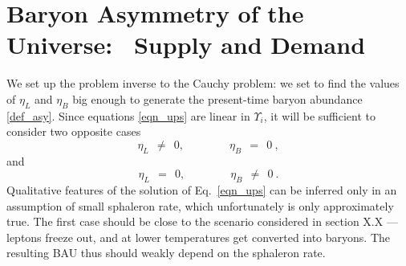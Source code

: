 \documentclass[12pt]{revtex4}
\newcommand{\GeV}{{\rm GeV}}
\begin{document}
%
%
		


%
%
\section{Baryon Asymmetry of the Universe: ~Supply and Demand}

	We set up the problem inverse to the Cauchy problem:
	we set to find the values of $ \eta_L $ and $ \eta_B $ 
	big enough to generate the present-time baryon 
	abundance \eqref{def_asy}.
	Since equations \eqref{eqn_ups} are linear in $ \Upsilon_i $,
	it will be sufficient to consider two opposite cases
\[
	\eta_L ~~\neq~~ 0,\qquad\qquad \eta_B ~~=~~ 0~, 
\]
	and
\[
	\eta_L ~~=~~ 0,\qquad\qquad \eta_B ~~\neq~~ 0~.
\]
	Qualitative features of the solution of Eq.~\eqref{eqn_ups} can
	be inferred only in an assumption of small sphaleron rate,
	which unfortunately is only approximately true.
	The first case should be close to the scenario considered in
	section X.X --- 
	leptons freeze out, and at lower temperatures get converted
	into baryons. 
	The resulting BAU thus should weakly depend on the sphaleron
	rate.
\end{document}
